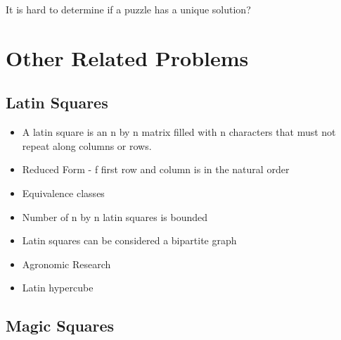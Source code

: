 \documentclass[a4paper,12pt]{article}
\begin{document}
It is hard to determine if a puzzle has a unique solution?
		
\section{Other Related Problems}
	\subsection{Latin Squares}

		\begin{itemize}
		\item{A latin square is an n by n matrix filled with n characters that must not repeat along columns or rows.}
		\item{Reduced Form - f first row and column is in the natural order}
		\item{Equivalence classes}
		\item{Number of n by n latin squares is bounded}
		\item{Latin squares can be considered a bipartite graph}
		\item{Agronomic Research}
		\item{Latin hypercube}
		\end{itemize}

	\subsection{Magic Squares}
\end{document}
